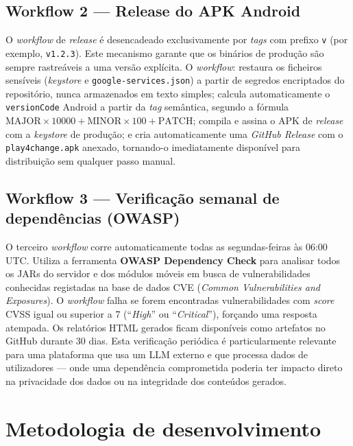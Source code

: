 \subsection*{Workflow 2 --- Release do APK Android}

\begin{sloppypar}
O \emph{workflow} de \emph{release} é desencadeado exclusivamente por \emph{tags} com prefixo \texttt{v} (por exemplo, \texttt{v1.2.3}). Este mecanismo garante que os binários de produção são sempre rastreáveis a uma versão explícita. O \emph{workflow}: restaura os ficheiros sensíveis (\emph{keystore} e \texttt{google-services.json}) a partir de segredos encriptados do repositório, nunca armazenados em texto simples; calcula automaticamente o \texttt{versionCode} Android a partir da \emph{tag} semântica, segundo a fórmula $\text{MAJOR} \times 10000 + \text{MINOR} \times 100 + \text{PATCH}$; compila e assina o APK de \emph{release} com a \emph{keystore} de produção; e cria automaticamente uma \emph{GitHub Release} com o \texttt{play4change.apk} anexado, tornando-o imediatamente disponível para distribuição sem qualquer passo manual.
\end{sloppypar}

\subsection*{Workflow 3 --- Verificação semanal de dependências (OWASP)}

O terceiro \emph{workflow} corre automaticamente todas as segundas-feiras às 06:00 UTC. Utiliza a ferramenta \textbf{OWASP Dependency Check} para analisar todos os JARs do servidor e dos módulos móveis em busca de vulnerabilidades conhecidas registadas na base de dados CVE (\emph{Common Vulnerabilities and Exposures}). O \emph{workflow} falha se forem encontradas vulnerabilidades com \emph{score} CVSS igual ou superior a 7 (``\emph{High}'' ou ``\emph{Critical}''), forçando uma resposta atempada. Os relatórios HTML gerados ficam disponíveis como artefatos no GitHub durante 30 dias. Esta verificação periódica é particularmente relevante para uma plataforma que usa um LLM externo e que processa dados de utilizadores --- onde uma dependência comprometida poderia ter impacto direto na privacidade dos dados ou na integridade dos conteúdos gerados.

\section{Metodologia de desenvolvimento}
\label{sec:metodologia-desenvolvimento}

